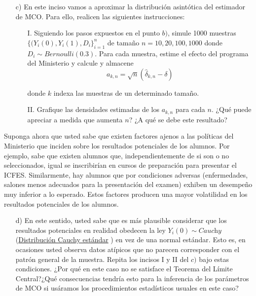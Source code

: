 \documentclass[a4paper]{article}
\begin{document}
\begin{itemize}
\item[c)] En este inciso vamos a aproximar la distribución asintótica del estimador de MCO. Para ello, realicen las siguientes instrucciones:    
    
    
    \begin{itemize}
        \item[I.] Siguiendo los pasos expuestos en el punto $b)$, simule 1000 muestras $\{(Y_{i}(0), Y_i(1), D_i\}_{i=1}^n$ de tamaño $n=10, 20, 100, 1000$   donde  $D_{i}\sim Bernoulli(0.3)$. Para cada muestra, estime el efecto del programa del Ministerio y calcule y almacene
        \begin{equation*}
            a_{k,n}=\sqrt{n}(\hat{\delta}_{k,n}-\delta)
        \end{equation*}
        
        donde $k$ indexa las muestras de un determinado tamaño.
        
        
        \item[II.] Grafique las densidades estimadas de los $a_{k,n}$ para cada $n$. ¿Qué puede apreciar a medida que aumenta $n$? ¿A qué se debe este resultado?
        
     \end{itemize}
  
 \end{itemize}    
 Suponga ahora que usted sabe que existen factores ajenos a las políticas del Ministerio que inciden sobre los resultados potenciales de los alumnos. Por ejemplo, sabe que existen alumnos que, independientemente de si son o no seleccionados, igual se inscribirían en cursos de preparación para presentar el ICFES. Similarmente, hay alumnos que por condiciones adversas (enfermedades, salones menos adecuados para la presentación del examen) exhiben un desempeño muy inferior a lo esperado. Estos factores producen una mayor volatilidad en los resultados potenciales de los alumnos. 
        \\
        
\begin{itemize}

 \item[d)] En este sentido, usted sabe que es más plausible considerar que los resultados potenciales en realidad obedecen la ley  $Y_{i}(0)\sim \textit{Cauchy}$ (\href{https://es.wikipedia.org/wiki/Distribuci\%C3\%B3n_de_Cauchy}{Distribución Cauchy estándar} ) en vez de una normal estándar. Esto es, en ocasiones usted observa datos atípicos que no parecen corresponder con el patrón general de la muestra. Repita los incisos I y II del $c)$ bajo estas condiciones. ¿Por qué en este caso no se satisface el Teorema del Límite Central?¿Qué consecuencias tendría esto para la inferencia de los parámetros de MCO si usáramos los procedimientos estadísticos usuales en este caso?
        
        
        
 \end{itemize} 
    
\end{document}
